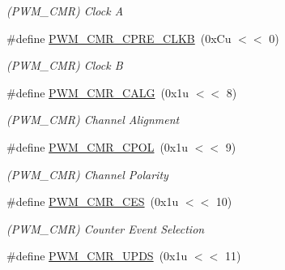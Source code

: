 \begin{DoxyCompactItemize}
\begin{DoxyCompactList}\small\item\em (P\+W\+M\+\_\+\+C\+MR) Clock A \end{DoxyCompactList}\item 
\mbox{\label{group__SAMS70__PWM_ga61f75d57082c66e697b6e9a0d1c7a871}} 
\#define \mbox{\hyperlink{group__SAMS70__PWM_ga61f75d57082c66e697b6e9a0d1c7a871}{P\+W\+M\+\_\+\+C\+M\+R\+\_\+\+C\+P\+R\+E\+\_\+\+C\+L\+KB}}~(0x\+Cu $<$$<$ 0)
\begin{DoxyCompactList}\small\item\em (P\+W\+M\+\_\+\+C\+MR) Clock B \end{DoxyCompactList}\item 
\mbox{\label{group__SAMS70__PWM_ga389acb2fd3cb962a815dc9bebf0d8c3b}} 
\#define \mbox{\hyperlink{group__SAMS70__PWM_ga389acb2fd3cb962a815dc9bebf0d8c3b}{P\+W\+M\+\_\+\+C\+M\+R\+\_\+\+C\+A\+LG}}~(0x1u $<$$<$ 8)
\begin{DoxyCompactList}\small\item\em (P\+W\+M\+\_\+\+C\+MR) Channel Alignment \end{DoxyCompactList}\item 
\mbox{\label{group__SAMS70__PWM_gaaf63b55ca5a5fca06ef63e14542b6d80}} 
\#define \mbox{\hyperlink{group__SAMS70__PWM_gaaf63b55ca5a5fca06ef63e14542b6d80}{P\+W\+M\+\_\+\+C\+M\+R\+\_\+\+C\+P\+OL}}~(0x1u $<$$<$ 9)
\begin{DoxyCompactList}\small\item\em (P\+W\+M\+\_\+\+C\+MR) Channel Polarity \end{DoxyCompactList}\item 
\mbox{\label{group__SAMS70__PWM_ga0bb07f5754d14efb326e0a4a6d0d275c}} 
\#define \mbox{\hyperlink{group__SAMS70__PWM_ga0bb07f5754d14efb326e0a4a6d0d275c}{P\+W\+M\+\_\+\+C\+M\+R\+\_\+\+C\+ES}}~(0x1u $<$$<$ 10)
\begin{DoxyCompactList}\small\item\em (P\+W\+M\+\_\+\+C\+MR) Counter Event Selection \end{DoxyCompactList}\item 
\mbox{\label{group__SAMS70__PWM_ga0286fa373fce5c6a2e8a5caa773fa792}} 
\#define \mbox{\hyperlink{group__SAMS70__PWM_ga0286fa373fce5c6a2e8a5caa773fa792}{P\+W\+M\+\_\+\+C\+M\+R\+\_\+\+U\+P\+DS}}~(0x1u $<$$<$ 11)
$$
\end{DoxyCompactItemize}
